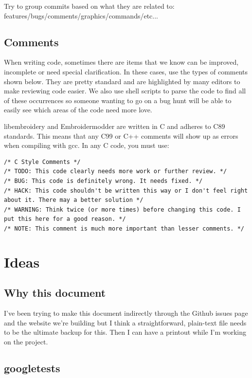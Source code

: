 \documentclass{report}
\begin{document}
Try to group commits based on what they are related to:
features/bugs/comments/graphics/commands/etc...

\subsection{Comments}

When writing code, sometimes there are items that we know can be
improved, incomplete or need special clarification. In these cases, use
the types of comments shown below. They are pretty standard and are
highlighted by many editors to make reviewing code easier. We also use
shell scripts to parse the code to find all of these occurrences so
someone wanting to go on a bug hunt will be able to easily see which
areas of the code need more love.

libembroidery and Embroidermodder are written in C and adheres to C89 standards. This means
that any C99 or C++ comments will show up as errors when compiling with
gcc. In any C code, you must use:

\begin{lstlisting}
/* C Style Comments */
/* TODO: This code clearly needs more work or further review. */
/* BUG: This code is definitely wrong. It needs fixed. */
/* HACK: This code shouldn't be written this way or I don't feel right about it. There may a better solution */
/* WARNING: Think twice (or more times) before changing this code. I put this here for a good reason. */
/* NOTE: This comment is much more important than lesser comments. */
\end{lstlisting}

\section{Ideas}

\subsection{Why this document}

I've been trying to make this document indirectly through the Github
issues page and the website we're building but I think a
straightforward, plain-text file needs to be the ultimate backup for
this. Then I can have a printout while I'm working on the project.

\subsection{googletests}
\end{document}
